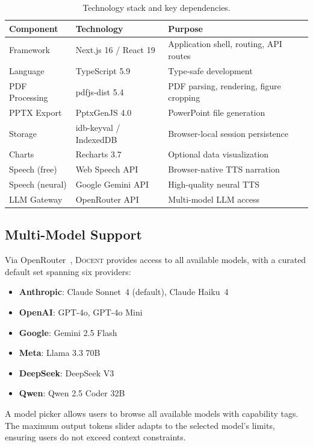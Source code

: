 \documentclass[11pt,a4paper]{article}
\newcommand{\system}{\textsc{Docent}\xspace}
\begin{document}
\begin{table}[t]
\centering
\caption{Technology stack and key dependencies.}
\label{tab:stack}
\begin{tabular}{@{}lll@{}}
\toprule
\textbf{Component} & \textbf{Technology} & \textbf{Purpose} \\
\midrule
Framework & Next.js 16 / React 19 & Application shell, routing, API routes \\
Language & TypeScript 5.9 & Type-safe development \\
PDF Processing & pdfjs-dist 5.4 & PDF parsing, rendering, figure cropping \\
PPTX Export & PptxGenJS 4.0 & PowerPoint file generation \\
Storage & idb-keyval / IndexedDB & Browser-local session persistence \\
Charts & Recharts 3.7 & Optional data visualization \\
Speech (free) & Web Speech API & Browser-native TTS narration \\
Speech (neural) & Google Gemini API & High-quality neural TTS \\
LLM Gateway & OpenRouter API & Multi-model LLM access \\
\bottomrule
\end{tabular}
\end{table}

\subsection{Multi-Model Support}

Via OpenRouter~\citep{openrouter2024}, \system provides access to all available models, with a curated default set spanning six providers:

\begin{itemize}[leftmargin=*,nosep]
    \item \textbf{Anthropic}: Claude Sonnet~4 (default), Claude Haiku~4
    \item \textbf{OpenAI}: GPT-4o, GPT-4o Mini
    \item \textbf{Google}: Gemini 2.5 Flash
    \item \textbf{Meta}: Llama 3.3 70B
    \item \textbf{DeepSeek}: DeepSeek V3
    \item \textbf{Qwen}: Qwen 2.5 Coder 32B
\end{itemize}

A model picker allows users to browse all available models with capability tags.
The maximum output tokens slider adapts to the selected model's limits, ensuring users do not exceed context constraints.
\end{document}
